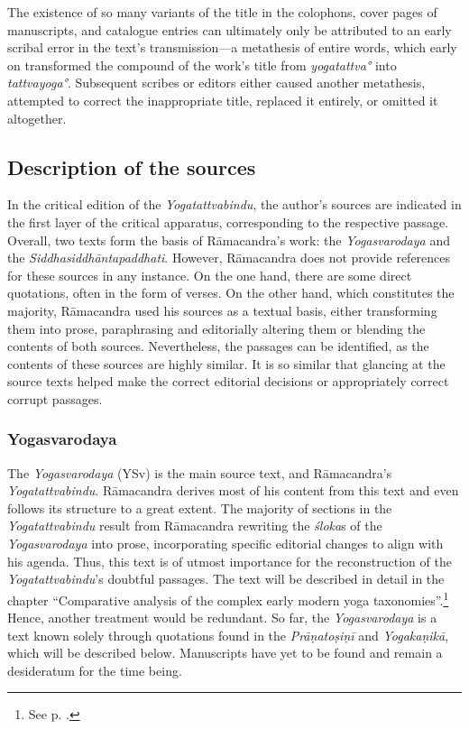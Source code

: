 The existence of so many variants of the title in the colophons, cover pages of manuscripts, and catalogue entries can ultimately only be attributed to an early scribal error in the text's transmission—a metathesis of entire words, which early on transformed the compound of the work's title from \textit{yogatattva°} into \textit{tattvayoga°}. Subsequent scribes or editors either caused another metathesis, attempted to correct the inappropriate title, replaced it entirely, or omitted it altogether.

\subsection{Description of the sources}

In the critical edition of the \emph{Yogatattvabindu}, the author's sources are indicated in the first layer of the critical apparatus, corresponding to the respective passage. Overall, two texts form the basis of Rāmacandra's work: the \emph{Yogasvarodaya} and the \emph{Siddhasiddhāntapaddhati}. However, Rāmacandra does not provide references for these sources in any instance. On the one hand, there are some direct quotations, often in the form of verses. On the other hand, which constitutes the majority, Rāmacandra used his sources as a textual basis, either transforming them into prose, paraphrasing and editorially altering them or blending the contents of both sources. Nevertheless, the passages can be identified, as the contents of these sources are highly similar. It is so similar that glancing at the source texts helped make the correct editorial decisions or appropriately correct corrupt passages.

\subsubsection{Yogasvarodaya}
\label{svaro}
The \emph{Yogasvarodaya} (YSv) is the main source text, and Rāmacandra's \emph{Yogatattvabindu}. Rāmacandra derives most of his content from this text and even follows its structure to a great extent. The majority of sections in the \emph{Yogatattvabindu} result from Rāmacandra rewriting the \emph{śloka}s of the \emph{Yogasvarodaya} into prose, incorporating specific editorial changes to align with his agenda. Thus, this text is of utmost importance for the reconstruction of the \emph{Yogatattvabindu}'s doubtful passages. The text will be described in detail in the chapter ``Comparative analysis of the complex early modern yoga taxonomies''.\footnote{See p. \pageref{yogasvarodayadescription}.} Hence, another treatment would be redundant. So far, the \emph{Yogasvarodaya} is a text known solely through quotations found in the \emph{Prāṇatoṣiṇī} and \emph{Yogakaṇikā}, which will be described below. Manuscripts have yet to be found and remain a desideratum for the time being. 

